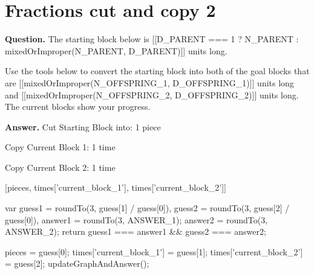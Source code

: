 \documentclass{article}
\begin{document}
\section*{Fractions cut and copy 2}
\textbf{Question.} The starting block below is [[D\_PARENT === 1 ? N\_PARENT : mixedOrImproper(N\_PARENT, D\_PARENT)]] units long.
                    
                    Use the tools below to convert the starting block into both of the goal blocks that are
                    [[mixedOrImproper(N\_OFFSPRING\_1, D\_OFFSPRING\_1)]] units long and [[mixedOrImproper(N\_OFFSPRING\_2, D\_OFFSPRING\_2)]] units long.
                    The current blocks show your progress.

\textbf{Answer.} Cut Starting Block into: 1 piece
                            
                                
                                
                            
                        
                        
                            Copy Current Block 1: 1 time
                            
                                
                                
                            
                        
                        
                            Copy Current Block 2: 1 time
                            
                                
                                
                            
                        
                    

                    
                        [pieces, times['current\_block\_1'], times['current\_block\_2']]
                    
                    
                        var guess1 = roundTo(3, guess[1] / guess[0]),
                            guess2 = roundTo(3, guess[2] / guess[0]),
                            answer1 = roundTo(3, ANSWER\_1);
                            answer2 = roundTo(3, ANSWER\_2);
                        return guess1 === answer1 \&\& guess2 === answer2;
                    
                    
                        pieces = guess[0];
                        times['current\_block\_1'] = guess[1];
                        times['current\_block\_2'] = guess[2];
                        updateGraphAndAnswer();
                    
\end{document}
